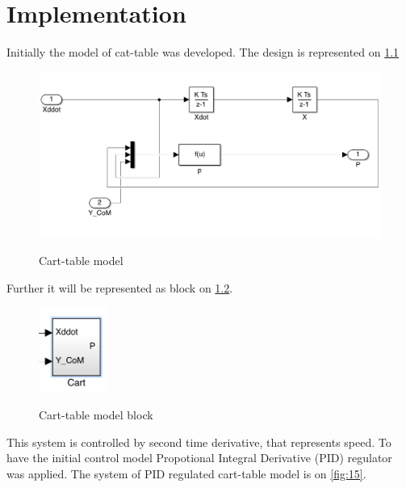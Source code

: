 \documentclass[12pt,a4paper]{report}
\begin{document}
	\chapter{Implementation}
		Initially the model of cat-table was developed. The design is represented on \cref{fig:13}
		\begin{figure}[h!]
			\vspace{-0.2cm}
			\centering
			{\includegraphics[width=1\textwidth]{13}}
			\caption{Cart-table model}
			\label{fig:13}
			\vspace{-0.1cm}
		\end{figure}
		
		Further it will be represented as block on \cref{fig:14}.
		
		\begin{figure}[h!]
			\vspace{-0.2cm}
			\centering
			{\includegraphics[width=0.2\textwidth]{14}}
			\caption{Cart-table model block}
			\label{fig:14}
			\vspace{-0.1cm}
		\end{figure}
		
		This system is controlled by second time derivative, that represents speed. To have the initial control model Propotional Integral Derivative (PID) regulator was applied. The system of PID regulated cart-table model is on \cref{fig:15}.
		
\end{document}
